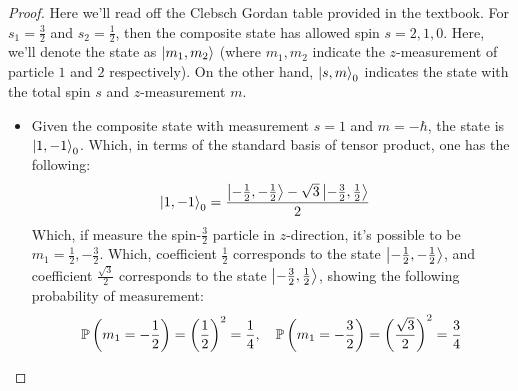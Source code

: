 \documentclass{article}
\begin{document}
\begin{proof}
    Here we'll read off the Clebsch Gordan table provided in the textbook. For $s_1=\frac{3}{2}$ and $s_2=\frac{1}{2}$, then the composite state has allowed spin $s=2,1,0$. Here, we'll denote the state as $\ket{m_1,m_2}$ (where $m_1,m_2$ indicate the $z$-measurement of particle $1$ and $2$ respectively). On the other hand, $\ket{s,m}_0$ indicates the state with the total spin $s$ and $z$-measurement $m$.
    
    \hfil

    \begin{itemize}
        \item[(a)] Given the composite state with measurement $s=1$ and $m=-\hbar$, the state is $\ket{1,-1}_0$. Which, in terms of the standard basis of tensor product, one has the following:
        \begin{align}
            \ket{1,-1}_0 &= \frac{\ket{-\frac{1}{2},-\frac{1}{2}} - \sqrt{3}\ket{-\frac{3}{2},\frac{1}{2}}}{2}
        \end{align}
        Which, if measure the spin-$\frac{3}{2}$ particle in $z$-direction, it's possible to be $m_1 = \frac{1}{2},-\frac{3}{2}$. Which, coefficient $\frac{1}{2}$ corresponds to the state $\ket{-\frac{1}{2},-\frac{1}{2}}$, and coefficient $\frac{\sqrt{3}}{2}$ corresponds to the state $\ket{-\frac{3}{2},\frac{1}{2}}$, showing the following probability of measurement:
        \begin{align}
            \mathbb{P}\left(m_1 = -\frac{1}{2}\right) = \left(\frac{1}{2}\right)^2=\frac{1}{4},\quad \mathbb{P}\left(m_1 = -\frac{3}{2}\right) = \left(\frac{\sqrt{3}}{2}\right)^2=\frac{3}{4}
        \end{align}

        \hfil


\end{itemize}
\end{proof}
\end{document}
